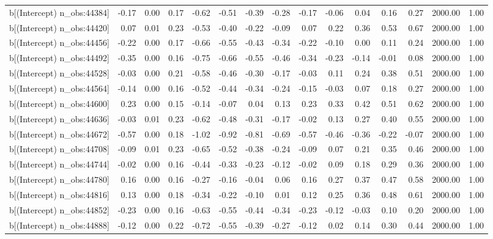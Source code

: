 \begin{table}[ht]
\begin{tabular}{rrrrrrrrrrrrrrr}
  b[(Intercept) n\_obs:44384] & -0.17 & 0.00 & 0.17 & -0.62 & -0.51 & -0.39 & -0.28 & -0.17 & -0.06 & 0.04 & 0.16 & 0.27 & 2000.00 & 1.00 \\ 
  b[(Intercept) n\_obs:44420] & 0.07 & 0.01 & 0.23 & -0.53 & -0.40 & -0.22 & -0.09 & 0.07 & 0.22 & 0.36 & 0.53 & 0.67 & 2000.00 & 1.00 \\ 
  b[(Intercept) n\_obs:44456] & -0.22 & 0.00 & 0.17 & -0.66 & -0.55 & -0.43 & -0.34 & -0.22 & -0.10 & 0.00 & 0.11 & 0.24 & 2000.00 & 1.00 \\ 
  b[(Intercept) n\_obs:44492] & -0.35 & 0.00 & 0.16 & -0.75 & -0.66 & -0.55 & -0.46 & -0.34 & -0.23 & -0.14 & -0.01 & 0.08 & 2000.00 & 1.00 \\ 
  b[(Intercept) n\_obs:44528] & -0.03 & 0.00 & 0.21 & -0.58 & -0.46 & -0.30 & -0.17 & -0.03 & 0.11 & 0.24 & 0.38 & 0.51 & 2000.00 & 1.00 \\ 
  b[(Intercept) n\_obs:44564] & -0.14 & 0.00 & 0.16 & -0.52 & -0.44 & -0.34 & -0.24 & -0.15 & -0.03 & 0.07 & 0.18 & 0.27 & 2000.00 & 1.00 \\ 
  b[(Intercept) n\_obs:44600] & 0.23 & 0.00 & 0.15 & -0.14 & -0.07 & 0.04 & 0.13 & 0.23 & 0.33 & 0.42 & 0.51 & 0.62 & 2000.00 & 1.00 \\ 
  b[(Intercept) n\_obs:44636] & -0.03 & 0.01 & 0.23 & -0.62 & -0.48 & -0.31 & -0.17 & -0.02 & 0.13 & 0.27 & 0.40 & 0.55 & 2000.00 & 1.00 \\ 
  b[(Intercept) n\_obs:44672] & -0.57 & 0.00 & 0.18 & -1.02 & -0.92 & -0.81 & -0.69 & -0.57 & -0.46 & -0.36 & -0.22 & -0.07 & 2000.00 & 1.00 \\ 
  b[(Intercept) n\_obs:44708] & -0.09 & 0.01 & 0.23 & -0.65 & -0.52 & -0.38 & -0.24 & -0.09 & 0.07 & 0.21 & 0.35 & 0.46 & 2000.00 & 1.00 \\ 
  b[(Intercept) n\_obs:44744] & -0.02 & 0.00 & 0.16 & -0.44 & -0.33 & -0.23 & -0.12 & -0.02 & 0.09 & 0.18 & 0.29 & 0.36 & 2000.00 & 1.00 \\ 
  b[(Intercept) n\_obs:44780] & 0.16 & 0.00 & 0.16 & -0.27 & -0.16 & -0.04 & 0.06 & 0.16 & 0.27 & 0.37 & 0.47 & 0.58 & 2000.00 & 1.00 \\ 
  b[(Intercept) n\_obs:44816] & 0.13 & 0.00 & 0.18 & -0.34 & -0.22 & -0.10 & 0.01 & 0.12 & 0.25 & 0.36 & 0.48 & 0.61 & 2000.00 & 1.00 \\ 
  b[(Intercept) n\_obs:44852] & -0.23 & 0.00 & 0.16 & -0.63 & -0.55 & -0.44 & -0.34 & -0.23 & -0.12 & -0.03 & 0.10 & 0.20 & 2000.00 & 1.00 \\ 
  b[(Intercept) n\_obs:44888] & -0.12 & 0.00 & 0.22 & -0.72 & -0.55 & -0.39 & -0.27 & -0.12 & 0.02 & 0.14 & 0.30 & 0.44 & 2000.00 & 1.00 \\ 

\end{tabular}
\end{table}
